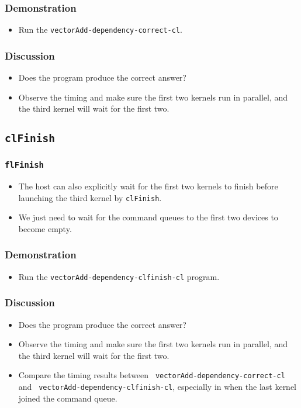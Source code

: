 \documentclass{beamer}
\begin{document}
\begin{frame}
  \frametitle{Demonstration}
  \begin{itemize}
    \item Run the {\tt vectorAdd-dependency-correct-cl}.
  \end{itemize}
\end{frame}

\begin{frame}
  \frametitle{Discussion}
  \begin{itemize}
    \item Does the program produce the correct answer?  
    \item Observe the timing and make sure the first two kernels run
      in parallel, and the third kernel will wait for the first two.
  \end{itemize}
\end{frame}

\subsection{\tt clFinish}

\begin{frame}
  \frametitle{\tt flFinish}
  \begin{itemize}
    \item The host can also explicitly wait for the first two kernels
      to finish before launching the third kernel by {\tt clFinish}.
    \item We just need to wait for the command queues to the first two
      devices to become empty.
  \end{itemize}
\end{frame}

\begin{frame}
\end{frame}

\begin{frame}
  \frametitle{Demonstration}
  \begin{itemize}
    \item Run the {\tt vectorAdd-dependency-clfinish-cl} program.
  \end{itemize}
\end{frame}

\begin{frame}
  \frametitle{Discussion}
  \begin{itemize}
    \item Does the program produce the correct answer?  
    \item Observe the timing and make sure the first two kernels run
      in parallel, and the third kernel will wait for the first two.
    \item Compare the timing results between {\tt
      vectorAdd-dependency-correct-cl} and {\tt
      vectorAdd-dependency-clfinish-cl}, especially in when the last
      kernel joined the command queue.
  \end{itemize}
\end{frame}
\end{document}
